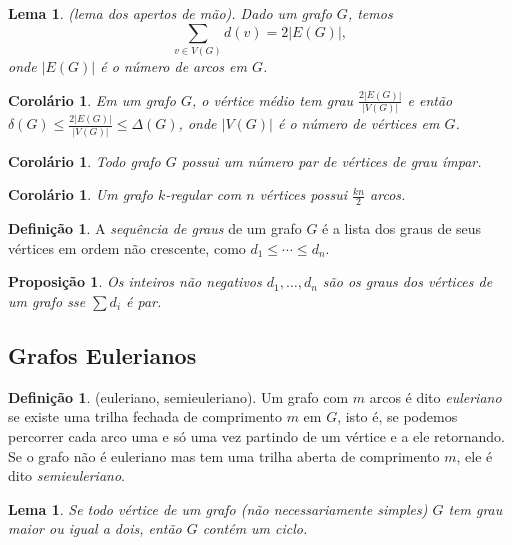 \documentclass{article}
\theoremstyle{plain}
\newtheorem{prop}[thm]{Proposição}
\newtheorem{lem}[thm]{Lema}
\newtheorem{cor}[thm]{Corolário}
\theoremstyle{definition}
\newtheorem{defn}[thm]{Definição}
\theoremstyle{remark}
\begin{document}
\begin{lem} (lema dos apertos de mão).
    Dado um grafo \(G\), temos 
    \begin{equation}
        \sum_{v \in V(G)} d(v) = 2|E(G)|,
    \end{equation}
    \noindent onde \(|E(G)|\) é o número de arcos em \(G\).
\end{lem}

\begin{cor}
    Em um grafo \(G\), o vértice médio tem grau \(\displaystyle \frac{2|E(G)|}{|V(G)|}\) e então \(\delta(G) \leq \displaystyle \frac{2|E(G)|}{|V(G)|} \leq \Delta(G)\), onde \(|V(G)|\) é o número de vértices em \(G\).
\end{cor}

\begin{cor}
    Todo grafo \(G\) possui um número par de vértices de grau ímpar.
\end{cor}

\begin{cor}
    Um grafo \(k\)-regular com \(n\) vértices possui \(\displaystyle \frac{kn}{2}\) arcos.
\end{cor}

\begin{defn}
    A \emph{sequência de graus} de um grafo \(G\) é a lista dos graus de seus vértices em ordem não crescente, como \(d_1 \leq \cdots \leq d_n\).
\end{defn}

\begin{prop}
    Os inteiros não negativos \(d_1, \ldots, d_n\) são os graus dos vértices de um grafo sse \(\sum d_i\) é par.
\end{prop}

\subsection{Grafos Eulerianos}

\begin{defn} (euleriano, semieuleriano).
    Um grafo com \(m\) arcos é dito \emph{euleriano} se existe uma trilha fechada de comprimento \(m\) em \(G\), isto é, se podemos percorrer cada arco uma e só uma vez partindo de um vértice e a ele retornando.
    Se o grafo não é euleriano mas tem uma trilha aberta de comprimento \(m\), ele é dito \emph{semieuleriano}.
\end{defn}

\begin{lem}
    Se todo vértice de um grafo (não necessariamente simples) \(G\) tem grau maior ou igual a dois, então \(G\) contém um ciclo.
\end{lem}
\end{document}
